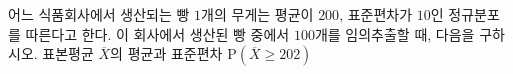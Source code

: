 어느 식품회사에서 생산되는 빵 $1$개의 무게는 평균이 $200$, 표준편차가 $10$인 정규분포를 따른다고 한다. 이 회사에서 생산된 빵 중에서 $100$개를 임의추출할 때, 다음을 구하시오. 
 표본평균 $\overline{X}$의 평균과 표준편차
 $\mathrm{P}(\overline{X}\ge 202)$ 
